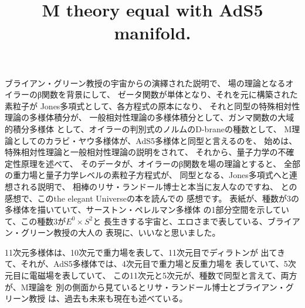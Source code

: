 \documentclass{jsarticle}
\begin{document}
\title{M theory equal with AdS5 manifold.}
\author{}
\date{}
\maketitle

   \newcommand{\variint}{%
	\begin{picture}(15,30)
		\put(0,0){
			$ \iint $}
		\put(0,5){\line(15,0){15}}
	\end{picture} %
}

\newcommand{\variiint}{%
	\begin{picture}(15,15)
		\put(0,0){
			$ \iiint $}
		\put(0,5){\line(15,0){20}}
	\end{picture} %
}



 \newcommand{\alearletter}{%
	 \begin{picture}(10,20)
		 \put(0,0){
			 $ \square $}
		 \put(0,0){\line(1,1){10}}
	 \end{picture} %
	 }


       ブライアン・グリーン教授の宇宙からの演繹された説明で、
    場の理論となるオイラーのβ関数を背景にして、
    ゼータ関数が単体となり、それを元に構築された素粒子が
    Jones多項式として、各方程式の原本になり、
    それと同型の特殊相対性理論の多様体積分が、
    一般相対性理論の多様体積分として、ガンマ関数の大域的積分多様体
    として、オイラーの判別式のノルムのD-braneの種数として、
    M理論としてのカラビ・ヤウ多様体が、AdS5多様体と同型と言えるのを、
    始めは、特殊相対性理論と一般相対性理論の説明をされて、
    それから、量子力学の不確定性原理を述べて、
    そのデータが、オイラーのβ関数を場の理論とすると、
    全部の重力場と量子力学レベルの素粒子方程式が、
    同型となる、Jones多項式へと連想される説明で、
    相棒のリサ・ランドール博士と本当に友人なのですね、
    との感想で、このthe elegant Universeの本を読んでの
    感想です。
    表紙が、種数が3の多様体を描いていて、サーストン・ペレルマン多様体
    の1部分空間を示していて、この種数3が$E^{0}\times S^{2} $と
    長生きする宇宙と、エロさまで表している、ブライアン・グリーン教授の大人の
    表現に、いいなと思いました。

    11次元多様体は、10次元で重力場を表して、11次元目でディラトンが
    出てきて、それが、AdS5多様体では、4次元目で重力場と反重力場を
    表していて、5次元目に電磁場を表していて、
    この11次元と5次元が、種数で同型と言えて、両方が、M理論を
    別の側面から見ているとリサ・ランドール博士とブライアン・グリーン教授
    は、過去も未来も現在も述べている。
\end{document}
